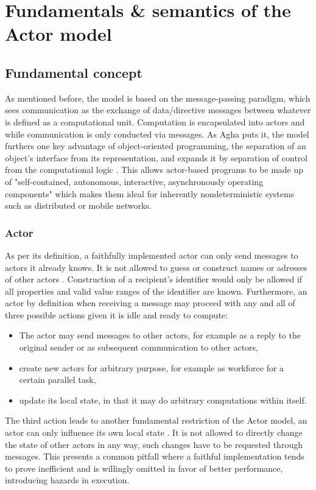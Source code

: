 \documentclass[A4]{article}
\begin{document}
\section{Fundamentals \& semantics of the Actor model}
\subsection{Fundamental concept}
As mentioned before, the model is based on the message-passing paradigm, which sees communication as the exchange of data/directive messages between whatever is defined as a computational unit. Computation is encapsulated into actors and while communication is only conducted via messages. As Agha puts it, the model furthers one key advantage of object-oriented programming, the separation of an object's interface from its representation, and expands it by separation of control from the computational logic \cite{reference/parallel/KarmaniA11}. This allows actor-based programs to be made up of "self-contained, autonomous, interactive, asynchronously operating components" \cite[p.~1]{reference/parallel/KarmaniA11} which makes them ideal for inherently nondeterministic systems such as distributed or mobile networks. 
\subsubsection{Actor}
As per its definition, a faithfully implemented actor can only send messages to actors it already knows. It is not allowed to guess or construct names or adresses of other actors \cite{reference/parallel/KarmaniA11}. Construction of a recipient's identifier would only be allowed if all properties and valid value ranges of the identifier are known. 
Furthermore, an actor by definition when receiving a message may proceed with any and all of three possible actions given it is idle and ready to compute: 
\begin{itemize}
\item The actor may send messages to other actors, for example as a reply to the original sender or as subsequent communication to other actors,
\item create new actors for arbitrary purpose, for example as workforce for a certain parallel task,
\item update its local state, in that it may do arbitrary computations within itself.
\end{itemize}
The third action leads to another fundamental restriction of the Actor model, an actor can only influence its own local state . It is not allowed to directly change the state of other actors in any way, such changes have to be requested through messages.\cite{reference/parallel/KarmaniA11} This presents a common pitfall where a faithful implementation tends to prove inefficient and is willingly omitted in favor of better performance, introducing hazards in execution. 
\end{document}
